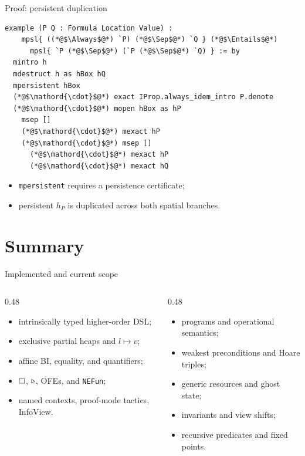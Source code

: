 \documentclass[10pt,aspectratio=169]{beamer}
\begin{document}
\begin{frame}[fragile]{Proof: persistent duplication}
\begin{lstlisting}[style=leancode]
example (P Q : Formula Location Value) :
    mpsl{ ((*@$\Always$@*) `P) (*@$\Sep$@*) `Q } (*@$\Entails$@*)
      mpsl{ `P (*@$\Sep$@*) (`P (*@$\Sep$@*) `Q) } := by
  mintro h
  mdestruct h as hBox hQ
  mpersistent hBox
  (*@$\mathord{\cdot}$@*) exact IProp.always_idem_intro P.denote
  (*@$\mathord{\cdot}$@*) mopen hBox as hP
    msep []
    (*@$\mathord{\cdot}$@*) mexact hP
    (*@$\mathord{\cdot}$@*) msep []
      (*@$\mathord{\cdot}$@*) mexact hP
      (*@$\mathord{\cdot}$@*) mexact hQ
\end{lstlisting}

  \begin{itemize}
    \item \texttt{mpersistent} requires a persistence certificate;
    \item persistent $h_P$ is duplicated across both spatial branches.
  \end{itemize}
\end{frame}

\section{Summary}

\begin{frame}{Implemented and current scope}
  \begin{columns}[T,onlytextwidth]
    \begin{column}{0.48\textwidth}
      \begin{itemize}
        \item intrinsically typed higher-order DSL;
        \item exclusive partial heaps and $l\mapsto v$;
        \item affine BI, equality, and quantifiers;
        \item $\mathord{\Box}$, $\mathord{\triangleright}$, OFEs, and \texttt{NEFun};
        \item named contexts, proof-mode tactics, InfoView.
      \end{itemize}
    \end{column}
    \begin{column}{0.48\textwidth}
      \begin{itemize}
        \item programs and operational semantics;
        \item weakest preconditions and Hoare triples;
        \item generic resources and ghost state;
        \item invariants and view shifts;
        \item recursive predicates and fixed points.
      \end{itemize}
    \end{column}
  \end{columns}
\end{frame}
\end{document}
